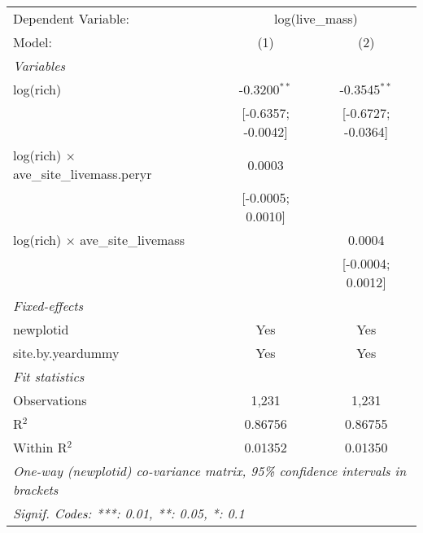 \begin{tabular}{lcc}
\tabularnewline\midrule\midrule
Dependent Variable:&\multicolumn{2}{c}{log(live\_mass)}\\
Model:&(1) & (2)\\
\midrule \emph{Variables}&   &  \\
log(rich)&-0.3200$^{**}$ & -0.3545$^{**}$\\
  &[-0.6357; -0.0042] & [-0.6727; -0.0364]\\
log(rich) $\times $ ave\_site\_livemass.peryr&0.0003 &   \\
  &[-0.0005; 0.0010] &   \\
log(rich) $\times $ ave\_site\_livemass&   & 0.0004\\
  &   & [-0.0004; 0.0012]\\
\midrule \emph{Fixed-effects}&   &  \\
newplotid & Yes & Yes\\
site.by.yeardummy & Yes & Yes\\
\midrule \emph{Fit statistics}&  & \\
Observations & 1,231&1,231\\
R$^2$ & 0.86756&0.86755\\
Within R$^2$ & 0.01352&0.01350\\
\midrule\midrule\multicolumn{3}{l}{\emph{One-way (newplotid) co-variance matrix, 95\% confidence intervals in brackets}}\\
\multicolumn{3}{l}{\emph{Signif. Codes: ***: 0.01, **: 0.05, *: 0.1}}\\
\end{tabular}


